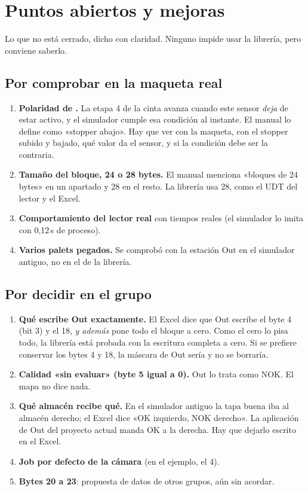 \chapter{Puntos abiertos y mejoras}\label{ap:abiertos}

Lo que no está cerrado, dicho con claridad. Ninguno impide usar la librería, pero conviene saberlo.

\section{Por comprobar en la maqueta real}
\begin{enumerate}
\item \textbf{Polaridad de .} La etapa 4 de la cinta avanza cuando este sensor \emph{deja} de estar activo, y el simulador cumple esa condición al instante. El manual lo define como «stopper abajo». Hay que ver con la maqueta, con el stopper subido y bajado, qué valor da el sensor, y si la condición debe ser la contraria.
\item \textbf{Tamaño del bloque, 24 o 28 bytes.} El manual menciona «bloques de 24 bytes» en un apartado y 28 en el resto. La librería usa 28, como el UDT del lector y el Excel.
\item \textbf{Comportamiento del lector real} con tiempos reales (el simulador lo imita con 0,12\,s de proceso).
\item \textbf{Varios palets pegados.} Se comprobó con la estación Out en el simulador antiguo, no en el de la librería.
\end{enumerate}

\section{Por decidir en el grupo}
\begin{enumerate}
\item \textbf{Qué escribe Out exactamente.} El Excel dice que Out escribe el byte 4 (bit 3) y el 18, \emph{y además} pone todo el bloque a cero. Como el cero lo pisa todo, la librería está probada con la escritura completa a cero. Si se prefiere conservar los bytes 4 y 18, la máscara de Out sería  y no se borraría.
\item \textbf{Calidad «sin evaluar» (byte 5 igual a 0).} Out lo trata como NOK. El mapa no dice nada.
\item \textbf{Qué almacén recibe qué.} En el simulador antiguo la tapa buena iba al almacén derecho; el Excel dice «OK izquierdo, NOK derecho». La aplicación de Out del proyecto actual manda OK a la derecha. Hay que dejarlo escrito en el Excel.
\item \textbf{Job por defecto de la cámara} (en el ejemplo, el 4).
\item \textbf{Bytes 20 a 23}: propuesta de datos de otros grupos, aún sin acordar.
\end{enumerate}


